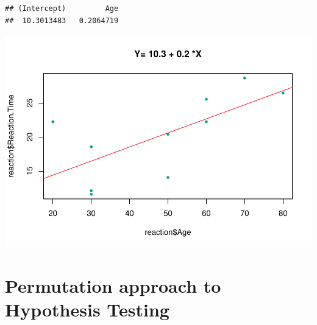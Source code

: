 \documentclass[
]{article}
\newenvironment{Shaded}{\begin{snugshade}}{\end{snugshade}}
\newcommand{\AttributeTok}[1]{\textcolor[rgb]{0.77,0.63,0.00}{#1}}
\newcommand{\DecValTok}[1]{\textcolor[rgb]{0.00,0.00,0.81}{#1}}
\newcommand{\FunctionTok}[1]{\textcolor[rgb]{0.00,0.00,0.00}{#1}}
\newcommand{\NormalTok}[1]{#1}
\newcommand{\OtherTok}[1]{\textcolor[rgb]{0.56,0.35,0.01}{#1}}
\newcommand{\SpecialCharTok}[1]{\textcolor[rgb]{0.00,0.00,0.00}{#1}}
\newcommand{\StringTok}[1]{\textcolor[rgb]{0.31,0.60,0.02}{#1}}
\begin{document}
\begin{verbatim}
## (Intercept)         Age 
##  10.3013483   0.2064719
\end{verbatim}

\begin{Shaded}
\end{Shaded}

\begin{center}\includegraphics{perm_files/figure-latex/unnamed-chunk-7-1} \end{center}

\hypertarget{permutation-approach-to-hypothesis-testing}{%
\section{Permutation approach to Hypothesis
Testing}\label{permutation-approach-to-hypothesis-testing}}
\end{document}
